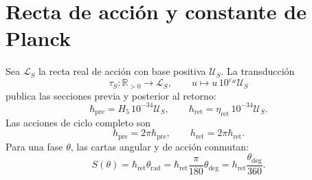 \section{Recta de acción y constante de Planck}
\label{sec:l9s102:recta-planck}

Sea \(\mathcal L_S\) la recta real de acción con base positiva
\(\mathcal U_S\). La transducción
\begin{equation}
 \tau_S:\mathbb R_{>0}\longrightarrow\mathcal L_S,
 \qquad u\longmapsto u\,10^{\varepsilon_H}\mathcal U_S
 \label{eq:l9s102:transductor-accion}
\end{equation}
publica las secciones previa y posterior al retorno:
\begin{equation}
 \hbar_{\mathrm{pre}}=H_5\,10^{-34}\mathcal U_S,
 \qquad
 \boxed{
 \hbar_{\mathrm{ret}}=\eta_{\mathrm{ret}}\,10^{-34}\mathcal U_S.}
 \label{eq:l9s102:hbar-pre-ret}
\end{equation}
Las acciones de ciclo completo son
\begin{equation}
 h_{\mathrm{pre}}=2\pi\hbar_{\mathrm{pre}},
 \qquad
 h_{\mathrm{ret}}=2\pi\hbar_{\mathrm{ret}}.
 \label{eq:l9s102:h-pre-ret}
\end{equation}
Para una fase \(\theta\), las cartas angular y de acción conmutan:
\begin{equation}
 S(\theta)
 =\hbar_{\mathrm{ret}}\theta_{\mathrm{rad}}
 =\hbar_{\mathrm{ret}}\frac{\pi}{180}\theta_{\deg}
 =h_{\mathrm{ret}}\frac{\theta_{\deg}}{360}.
 \label{eq:l9s102:accion-fase}
\end{equation}

